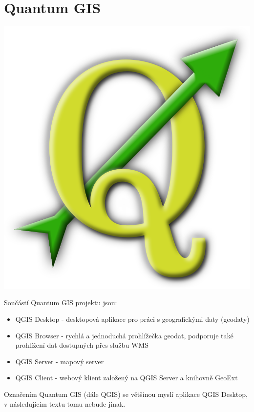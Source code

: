 \newpage
\section{Quantum GIS}

\nocite{qgis:www}

\begin{center}
	\includegraphics[scale=0.2]{pictures/qgis_logo}
\end{center}

\noindent Součástí Quantum GIS projektu jsou:
\begin{itemize}
	\item QGIS Desktop - desktopová aplikace pro práci s geografickými daty (geodaty)
	\item QGIS Browser - rychlá a jednoduchá prohlížečka geodat, podporuje také prohlížení dat dostupných přes službu WMS
	\item QGIS Server - mapový server 
	\item QGIS Client - webový klient založený na QGIS Server a knihovně GeoExt
\end{itemize}

Označením Quantum GIS (dále QGIS) se většinou myslí aplikace QGIS
Desktop, v následujícím textu tomu nebude jinak.

